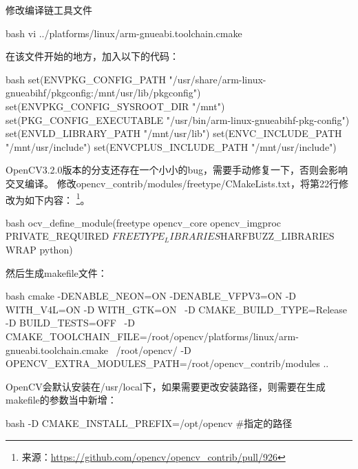 \begin{outline}[enumerate]
修改编译链工具文件
\begin{code-in-enumerate}{bash}
vi ../platforms/linux/arm-gnueabi.toolchain.cmake
\end{code-in-enumerate}

在该文件开始的地方，加入以下的代码：
\begin{code-in-enumerate}{bash}
set(ENV{PKG_CONFIG_PATH} "/usr/share/arm-linux-gnueabihf/pkgconfig:/mnt/usr/lib/pkgconfig")
set(ENV{PKG_CONFIG_SYSROOT_DIR} "/mnt")
set(PKG_CONFIG_EXECUTABLE "/usr/bin/arm-linux-gnueabihf-pkg-config")
set(ENV{LD_LIBRARY_PATH} "/mnt/usr/lib")
set(ENV{C_INCLUDE_PATH} "/mnt/usr/include")
set(ENV{CPLUS_INCLUDE_PATH} "/mnt/usr/include")
\end{code-in-enumerate}

OpenCV3.2.0版本的分支还存在一个小小的bug，需要手动修复一下，否则会影响交叉编译。
修改opencv\_contrib/modules/freetype/CMakeLists.txt，将第22行修改为如下内容：
\footnote{来源：\url{https://github.com/opencv/opencv_contrib/pull/926}}。
\begin{code-in-enumerate}{bash}
ocv_define_module(freetype opencv_core opencv_imgproc PRIVATE_REQUIRED ${FREETYPE_LIBRARIES} ${HARFBUZZ_LIBRARIES} WRAP python)
\end{code-in-enumerate}

然后生成makefile文件：
\begin{code-in-enumerate}{bash}
cmake -DENABLE_NEON=ON -DENABLE_VFPV3=ON  -D WITH_V4L=ON  -D WITH_GTK=ON \
    -D CMAKE_BUILD_TYPE=Release -D BUILD_TESTS=OFF \
    -D CMAKE_TOOLCHAIN_FILE=/root/opencv/platforms/linux/arm-gnueabi.toolchain.cmake \
    /root/opencv/ -D OPENCV_EXTRA_MODULES_PATH=/root/opencv_contrib/modules ..
\end{code-in-enumerate}

OpenCV会默认安装在/usr/local下，如果需要更改安装路径，则需要在生成makefile的参数当中新增：
\begin{code-in-enumerate}{bash}
-D CMAKE_INSTALL_PREFIX=/opt/opencv #指定的路径
\end{code-in-enumerate}


\end{outline}
